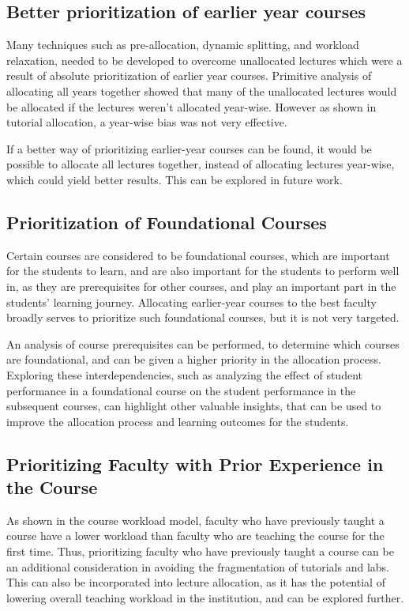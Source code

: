 \subsection{Better prioritization of earlier year courses}

Many techniques such as pre-allocation, dynamic splitting, and workload relaxation, needed to be developed to overcome unallocated lectures which were a result of absolute prioritization of earlier year courses. Primitive analysis of allocating all years together showed that many of the unallocated lectures would be allocated if the lectures weren't allocated year-wise. However as shown in tutorial allocation, a year-wise bias was not very effective.

If a better way of prioritizing earlier-year courses can be found, it would be possible to allocate all lectures together, instead of allocating lectures year-wise, which could yield better results. This can be explored in future work.

\subsection{Prioritization of Foundational Courses}

Certain courses are considered to be foundational courses, which are important for the students to learn, and are also important for the students to perform well in, as they are prerequisites for other courses, and play an important part in the students' learning journey. Allocating earlier-year courses to the best faculty broadly serves to prioritize such foundational courses, but it is not very targeted.

An analysis of course prerequisites can be performed, to determine which courses are foundational, and can be given a higher priority in the allocation process. Exploring these interdependencies, such as analyzing the effect of student performance in a foundational course on the student performance in the subsequent courses, can highlight other valuable insights, that can be used to improve the allocation process and learning outcomes for the students.

\subsection{Prioritizing Faculty with Prior Experience in the Course}

As shown in the course workload model, faculty who have previously taught a course have a lower workload than faculty who are teaching the course for the first time. Thus, prioritizing faculty who have previously taught a course can be an additional consideration in avoiding the fragmentation of tutorials and labs. This can also be incorporated into lecture allocation, as it has the potential of lowering overall teaching workload in the institution, and can be explored further.

